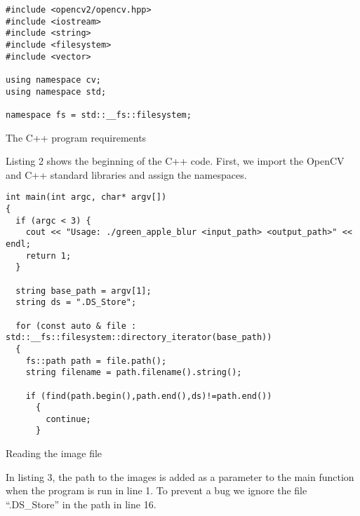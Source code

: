 
\begin{listing}[!ht]
\begin{verbatim}
#include <opencv2/opencv.hpp>
#include <iostream>
#include <string>
#include <filesystem>
#include <vector>

using namespace cv;
using namespace std;

namespace fs = std::__fs::filesystem;
\end{verbatim}
\caption{The C++ program requirements}
\label{listing:c++requirements}
\end{listing}

Listing 2 shows the beginning of the C++ code. First, we import the OpenCV and C++ standard libraries and assign the namespaces.

\begin{listing}[ht]
\begin{verbatim}
int main(int argc, char* argv[])
{
  if (argc < 3) {
    cout << "Usage: ./green_apple_blur <input_path> <output_path>" << endl;
    return 1;
  }

  string base_path = argv[1];
  string ds = ".DS_Store";

  for (const auto & file : std::__fs::filesystem::directory_iterator(base_path))
  {
    fs::path path = file.path();
    string filename = path.filename().string();

    if (find(path.begin(),path.end(),ds)!=path.end())
      {
        continue;
      }

\end{verbatim}
\caption{Reading the image file}
\label{listing:c++-read}
\end{listing}

In listing 3, the path to the images is added as a parameter to the main function when the program is run in line 1. To prevent a bug we ignore the file “.DS\_Store” in the path in line 16.

